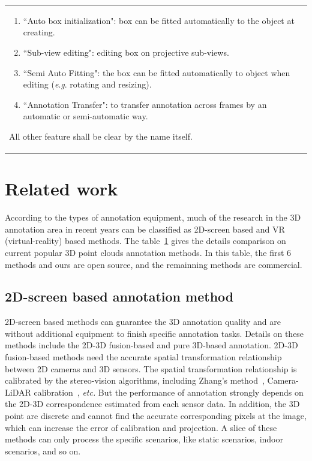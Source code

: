 \documentclass[letterpaper, 10 pt, conference]{ieeeconf}  %
\begin{document}
\begin{table}[ht]
\begin{tabular}{p{17.5cm}}
\begin{enumerate}
			\item ``Auto box initialization": box can be fitted automatically to the object at creating.
			
			\item ``Sub-view editing": editing box on projective sub-views.
			
			\item ``Semi Auto Fitting": the box can be fitted  automatically  to object when editing (\textit{e}.\textit{g}. rotating and resizing).
			
			\item ``Annotation Transfer": to transfer annotation across frames by an automatic or semi-automatic way.
			
		\end{enumerate}

		All other feature shall be clear by the name itself.
		
	\end{tabular}
	\label{tab:annotationMethods}
	\vspace{-0.5cm}
\end{table}


\section{Related work}
\label{Realtedwork}
According to the types of annotation equipment, much of the research in the 3D annotation area in recent years can be classified as 2D-screen based and VR (virtual-reality) based methods. The table~\ref{tab:annotationMethods} gives the details comparison on current popular 3D point clouds annotation methods. In this table, the first 6 methods and ours are open source, and the remainning methods are commercial.
\subsection{2D-screen based annotation method}
2D-screen based methods can guarantee the 3D annotation quality and are without additional equipment to finish specific annotation tasks.
Details on these methods include the 2D-3D fusion-based and pure 3D-based annotation.
2D-3D fusion-based methods need the accurate spatial transformation relationship between 2D cameras and 3D sensors.
The spatial transformation relationship is calibrated by the stereo-vision algorithms, including Zhang's method~\cite{zhangzhegnyou}, Camera-LiDAR calibration~\cite{roadCalibration}, \emph{etc.}
But the performance of annotation strongly depends on the 2D-3D correspondence estimated from each sensor data. In addition, the 3D point are discrete and cannot find the accurate corresponding pixels at the image, which can increase the error of calibration and projection. A slice of these methods can only process the specific scenarios, like static scenarios, indoor scenarios, and so on.
\end{document}
